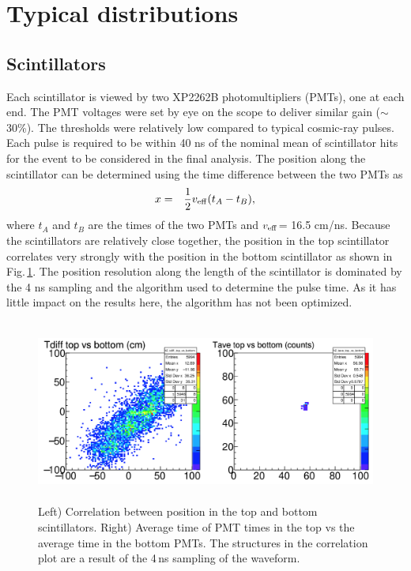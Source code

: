 \documentclass[12pt]{article}
\begin{document}
\section{Typical distributions}

\subsection{Scintillators}
Each scintillator is viewed by two XP2262B photomultipliers (PMTs), one at each end. The PMT voltages were set by eye on the scope to deliver similar gain ($\sim$ 30\%). The thresholds were relatively low compared to typical cosmic-ray pulses. Each pulse is required to be within 40 ns of the nominal mean of scintillator hits for the event to be considered in the final analysis. The position along the scintillator can be determined using the time difference between the two PMTs as 
\begin{eqnarray}
x & = & \frac{1}{2} v_{\rm eff} (t_A - t_B),
\end{eqnarray}
where $t_A$ and $t_B$ are the times of the two PMTs and $v_{\rm eff}$= 16.5 cm/ns. Because the scintillators are relatively close together, the position in the top scintillator correlates very strongly with the position in the bottom scintillator as shown in Fig.\,\ref{fig:Scintillator_correlation}. The position resolution along the length of the scintillator is dominated by the 4 ns sampling and the algorithm used to determine the pulse time. As it has little impact on the results here, the algorithm has not been optimized. 
\begin{figure}[tbph]
\begin{center}
\includegraphics[height=6cm,clip=true]{Scintillator_correlation}
\caption{Left) Correlation between position in the top and bottom scintillators. Right) Average time of PMT times in the top vs the average time in the bottom PMTs. The structures in the correlation plot are a result of the 4\,ns sampling of the waveform.
\label{fig:Scintillator_correlation}}
\end{center}
\end{figure} 
\end{document}
